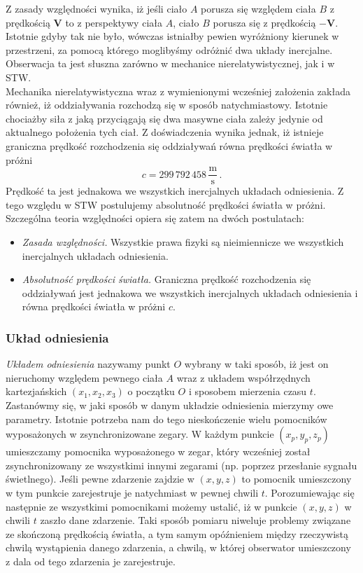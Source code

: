 \documentclass[../main.tex]{subfiles}
\begin{document}
Z zasady względności wynika, iż jeśli ciało \(A\) porusza się względem ciała \(B\) z prędkością
\(\mathbf{V}\) to z perspektywy ciała \(A\), ciało \(B\) porusza się z prędkością \(-\mathbf{V}\).
Istotnie gdyby tak nie było, wówczas istniałby pewien wyróżniony kierunek w przestrzeni, za pomocą
którego moglibyśmy odróżnić dwa układy inercjalne. Obserwacja ta jest słuszna zarówno w mechanice
nierelatywistycznej, jak i w STW.\\

Mechanika nierelatywistyczna wraz z wymienionymi wcześniej założenia zakłada również, iż
oddziaływania rozchodzą się w sposób natychmiastowy. Istotnie chociażby siła z jaką przyciągają się
dwa masywne ciała zależy jedynie od aktualnego położenia tych ciał. Z doświadczenia wynika jednak,
iż istnieje graniczna prędkość rozchodzenia się oddziaływań równa prędkości światła w próżni
\begin{equation*}
    c=299\,792\,458\,\frac{\text{m}}{\text{s}}\,.
\end{equation*}
Prędkość ta jest jednakowa we wszystkich inercjalnych układach odniesienia. Z tego względu w STW
postulujemy absolutność prędkości światła w próżni. Szczególna teoria względności opiera się zatem
na dwóch postulatach:
\begin{itemize}
    \item \textit{Zasada względności.} Wszystkie prawa fizyki są nieimiennicze we wszystkich
    inercjalnych układach odniesienia.
    \item \textit{Absolutność prędkości światła.} Graniczna prędkość rozchodzenia się oddziaływań
    jest jednakowa we wszystkich inercjalnych układach odniesienia i równa prędkości światła w
    próżni \(c\).
\end{itemize}

\subsubsection{Układ odniesienia}
\textit{Układem odniesienia} nazywamy punkt \(O\) wybrany w taki sposób, iż jest on nieruchomy
względem pewnego ciała \(A\) wraz z układem współrzędnych kartezjańskich \((x_1,x_2,x_3)\) o
początku \(O\) i sposobem mierzenia czasu \(t\).\\

Zastanówmy się, w jaki sposób w danym układzie odniesienia mierzymy owe parametry. Istotnie potrzeba
nam do tego nieskończenie wielu pomocników wyposażonych w zsynchronizowane zegary. W każdym punkcie
\((x_p,y_p,z_p)\) umieszczamy pomocnika wyposażonego w zegar, który wcześniej został
zsynchronizowany ze wszystkimi innymi zegarami (np. poprzez przesłanie sygnału świetlnego). Jeśli
pewne zdarzenie zajdzie w \((x,y,z)\) to pomocnik umieszczony w tym punkcie zarejestruje je
natychmiast w pewnej chwili \(t\). Porozumiewając się następnie ze wszystkimi pomocnikami możemy
ustalić, iż w punkcie \((x,y,z)\) w chwili \(t\) zaszło dane zdarzenie. Taki sposób pomiaru niweluje
problemy związane ze skończoną prędkością światła, a tym samym opóźnieniem między rzeczywistą chwilą
wystąpienia danego zdarzenia, a chwilą, w której obserwator umieszczony z dala od tego zdarzenia je
zarejestruje.\\
\end{document}
